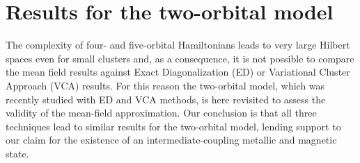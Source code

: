 \documentclass[aps,prb,superscriptaddress,preprintnumbers,
showpacs,legalpaper,twoside,twocolumn,amsmath,amssymb]{revtex4}
\begin{document}
\section{Results for the two-orbital model}\label{sec:twoorbs}

The complexity of four- and five-orbital Hamiltonians leads to very
large Hilbert spaces even for small clusters and, as a consequence,
it is not possible to compare the mean field results against
Exact Diagonalization (ED)\cite{RMP} or Variational Cluster
Approach (VCA)\cite{Aic03,Pot03} results. For this reason
the two-orbital model, which was recently studied
with ED and VCA methods,\cite{daghofer} is here revisited to assess the validity
of the mean-field approximation. Our conclusion is that all
three techniques lead to similar results for the two-orbital model,
lending support to  our claim for the
existence of an intermediate-coupling metallic
and magnetic state.
\end{document}
